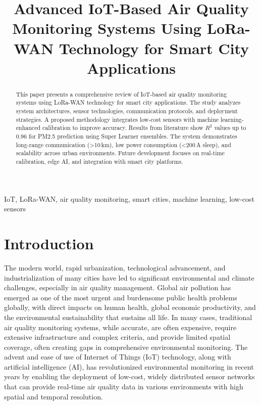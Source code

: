 \documentclass[conference]{IEEEtran}
\begin{document}
\title{Advanced IoT-Based Air Quality Monitoring Systems Using LoRa-WAN Technology for Smart City Applications}

\author{
}

\maketitle

\begin{abstract}
This paper presents a comprehensive review of IoT-based air quality monitoring systems using LoRa-WAN technology for smart city applications. The study analyzes system architectures, sensor technologies, communication protocols, and deployment strategies. A proposed methodology integrates low-cost sensors with machine learning-enhanced calibration to improve accuracy. Results from literature show $R^2$ values up to 0.96 for PM2.5 prediction using Super Learner ensembles. The system demonstrates long-range communication (>10\,km), low power consumption (<200\,\textmu A sleep), and scalability across urban environments. Future development focuses on real-time calibration, edge AI, and integration with smart city platforms.
\end{abstract}

\begin{IEEEkeywords}
IoT, LoRa-WAN, air quality monitoring, smart cities, machine learning, low-cost sensors
\end{IEEEkeywords}

\section{Introduction}
The modern world, rapid urbanization, technological advancement, and industrialization of many cities have led to significant environmental and climate challenges, especially in air quality management. Global air pollution has emerged as one of the most urgent and burdensome public health problems globally, with direct impacts on human health, global economic productivity, and the environmental sustainability that sustains all life. In many cases, traditional air quality monitoring systems, while accurate, are often expensive, require extensive infrastructure and complex criteria, and provide limited spatial coverage, often creating gaps in comprehensive environmental monitoring. The advent and ease of use of Internet of Things (IoT) technology, along with artificial intelligence (AI), has revolutionized environmental monitoring in recent years by enabling the deployment of low-cost, widely distributed sensor networks that can provide real-time air quality data in various environments with high spatial and temporal resolution.
\end{document}
